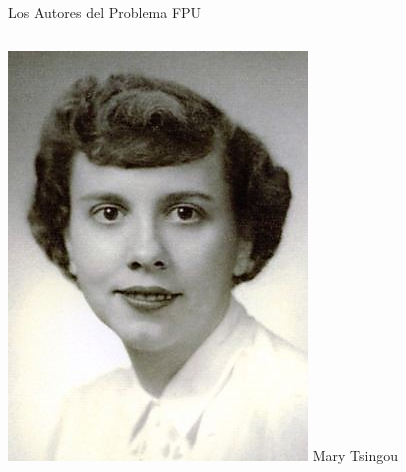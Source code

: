 \begin{frame}{Los Autores del Problema FPU}
\begin{columns}[T]
        \begin{column}{0.24\textwidth}
            \centering
            \includegraphics[width=\textwidth]{images/tsingou.jpg}
            Mary Tsingou
        \end{column}
    \end{columns}
\end{frame}

